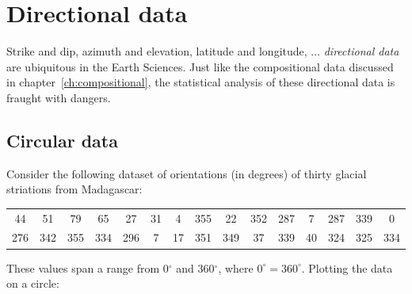 \chapter{Directional data}
\label{ch:directional}

Strike and dip, azimuth and elevation, latitude and longitude,
$\ldots$ \textit{directional data} are ubiquitous in the Earth
Sciences. Just like the compositional data discussed in
chapter~\ref{ch:compositional}, the statistical analysis of these
directional data is fraught with dangers.

\section{Circular data}
\label{sec:circular}

Consider the following dataset of orientations (in degrees) of thirty
glacial striations from Madagascar:

\begin{center}
\begin{tabular}{ccccccccccccccc}
44 & 51 & 79 & 65 & 27 & 31 & 4 & 355 & 22 & 352 & 287 & 7 & 287 & 339 & 0 \\
276 & 342 & 355 & 334 & 296 & 7 & 17 & 351 & 349 & 37 & 339 & 40 & 324 & 325 & 334\\
\end{tabular}
\end{center}

These values span a range from 0$^{\circ}$ and 360$^{\circ}$, where
$0^{\circ}=360^{\circ}$. Plotting the data on a circle:

